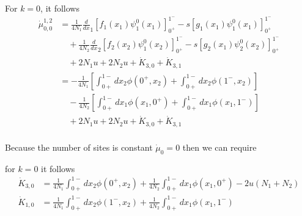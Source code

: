 \documentclass[a4paper, 12pt]{article}
\newcommand{\dev}[1]{\ensuremath{\frac{d}{d #1}}}
\begin{document}
For $k = 0$, it follows 
\begin{align}
  \dot \mu_{0,0}^{1,2} &= 
  \frac{1}{4N_1} \dev x_1 [f_1(x_1)\psi_1^0(x_1)]_{0^+}^{1^-}
  - s [g_1(x_1)\psi_1^0(x_1)]_{0^+}^{1^-}
  \nonumber \\
  &\quad + \frac{1}{4N_2} \dev x_2 [f_2(x_2)\psi_1^0(x_2)]_{0^+}^{1^-}
  - s [g_2(x_1)\psi_2^0(x_2)]_{0^+}^{1^-}
  \nonumber \\
  &\quad +2N_1u + 2N_2u + \dot K_{3,0}  + \dot K_{3,1}
  \nonumber \\
 &= - \frac{1}{4N_1}[\int_{0+}^{1-} dx_2\phi(0^+, x_2) + \int_{0+}^{1-}
   dx_2\phi(1^-,x_2)]
   \nonumber \\
  &\quad - \frac{1}{4N_2}[\int_{0+}^{1-} dx_1\phi(x_1, 0^+) + \int_{0+}^{1-}
   dx_1\phi(x_1, 1^-)]
  \nonumber \\
  &\quad +2N_1u + 2N_2u + \dot K_{3,0}  + \dot K_{3,1}
  \nonumber \\
\end{align}

Because the number of sites is constant $\dot \mu_0 = 0$ then we can require

for $k = 0$ it follows 
\begin{align}
  \dot K_{3,0} &= 
  \frac{1}{4N_1}\int_{0+}^{1-} dx_2\phi(0^+, x_2) + 
  \frac{1}{4N_2}\int_{0+}^{1-} dx_1\phi(x_1, 0^+) - 
  2u(N_1 + N_2) \\
  \dot K_{1,0} &= 
  \frac{1}{4N_1}\int_{0+}^{1-} dx_2\phi(1^-, x_2) + 
  \frac{1}{4N_2}\int_{0+}^{1-} dx_1\phi(x_1, 1^-) 
\end{align}
\end{document}
